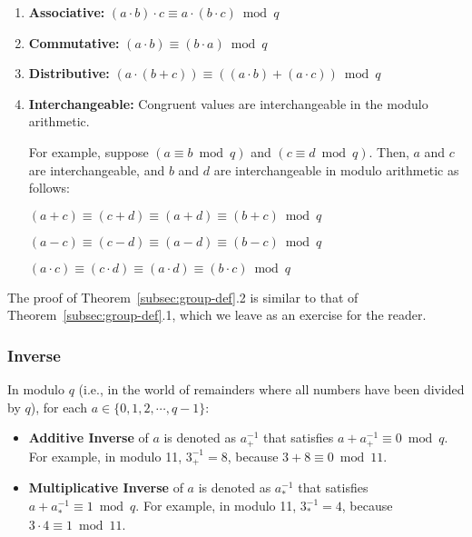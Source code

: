 \begin{tcolorbox}[title={\textbf{\tboxtheorem{\ref*{subsec:group-def}.2} Properties of Modulo Arithmetic}}]

\begin{enumerate}
\item \textbf{Associative:} $(a \cdot b) \cdot c \equiv a \cdot (b \cdot c) \bmod q$

\item \textbf{Commutative:} $(a \cdot b) \equiv (b \cdot a) \bmod q$

\item \textbf{Distributive:} $(a \cdot (b + c)) \equiv ((a \cdot b) + (a \cdot c))  \bmod q$

\item \textbf{Interchangeable:} Congruent values are interchangeable in the modulo arithmetic. 

For example, suppose $(a \equiv b \bmod q)$ and $(c \equiv d \bmod q)$. Then, $a$ and $c$ are interchangeable, and $b$ and $d$ are interchangeable in modulo arithmetic as follows:

$(a + c) \equiv (c + d) \equiv (a + d) \equiv (b + c) \bmod q$

$(a - c) \equiv (c - d) \equiv (a - d) \equiv (b - c) \bmod q$

$(a \cdot c) \equiv (c \cdot d) \equiv (a \cdot d) \equiv (b \cdot c) \bmod q$

\end{enumerate}

\end{tcolorbox}

The proof of Theorem~\ref*{subsec:group-def}.2 is similar to that of Theorem~\ref*{subsec:group-def}.1, which we leave as an exercise for the reader. 


\subsubsection{Inverse}
\label{subsec:modulo-inverse}

\begin{tcolorbox}[title={\textbf{\tboxdef{\ref*{subsec:modulo-inverse}} Inverse in Modulo Arithmetic}}]


In modulo $q$ (i.e., in the world of remainders where all numbers have been divided by $q$), for each $a \in \{0, 1, 2, \cdots, q-1\}$:

\begin{itemize}

\item \textbf{Additive Inverse} of $a$ is denoted as $a_+^{-1}$ that satisfies $a + a_+^{-1} \equiv 0 \bmod q$. For example, in modulo 11, $3_+^{-1} = 8$, because $3 + 8 \equiv 0 \bmod 11$.

\item \textbf{Multiplicative Inverse} of $a$ is denoted as $a_*^{-1}$ that satisfies $a + a_*^{-1} \equiv 1 \bmod q$. For example, in modulo 11, $3_*^{-1} = 4$, because $3 \cdot 4 \equiv 1 \bmod 11$.

\end{itemize}

\end{tcolorbox}

